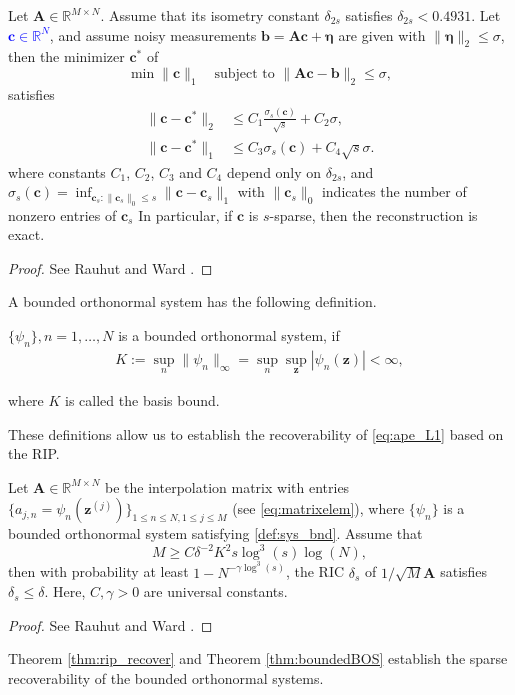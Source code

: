 \begin{thm}\label{thm:rip_recover}
Let $\bm A\in \mathbb{R}^{M\times N}$. Assume that its isometry constant $\delta_{2s}$ satisfies $\delta_{2s}<0.4931$. 
Let \textcolor{blue}{$\bm{c}\in\mathbb{R}^N$}, and assume noisy measurements $\bm{b} = \bm{A}\bm{c} + \bm{\eta}$ are given with $\|\bm{\eta}\|_2\leq \sigma$, then the minimizer $\bm{c}^*$ of 
\begin{equation*}
\min \|\bm{c}\|_1 \quad \textrm{subject to }\|\bm A\bm{c}-\bm{b}\|_2\leq \sigma,
\end{equation*}
satisfies
\begin{equation}\label{eq:error}
\begin{split}
\|\bm{c}-\bm{c}^*\|_2&\leq C_1 \frac{\sigma_s(\bm{c})}{\sqrt{s}}+C_2\sigma,\\
\|\bm{c}-\bm{c}^*\|_1&\leq C_3\sigma_s(\bm{c})+C_4\sqrt{s}\sigma.
\end{split}
\end{equation}
where constants $C_1$, $C_2$, $C_3$ and $C_4$ depend only on $\delta_{2s}$, and $\sigma_s(\bm{c}) = \inf_{{\bm{c}_s:\|\bm{c}_s\|_0\leq s}}\|\bm{c}-\bm{c}_s\|_1$ with $\|\bm{c}_s\|_0$ indicates the number of nonzero entries of $\bm{c}_s$ In particular, if $\bm{c}$ is $s$-sparse, then the reconstruction is exact.
\end{thm}
\begin{proof}
    See Rauhut and Ward \cite{Rauhut_2012sparseLegen}.
\end{proof}

A bounded orthonormal system has the following definition.
{\color{blue}\begin{defn}\label{def:bnd_orth_sys}
    $\{\psi_n\}, n = 1, \ldots, N$ is a bounded orthonormal system, if
    \begin{align}\label{def:sys_bnd}
        K:=\sup_{n}\|\psi_n\|_{\infty}=\sup_n\sup_{\bm{z}}|\psi_n(\bm{z})|< \infty,
    \end{align}
\end{defn}
where $K$ is called the basis bound. }

These definitions allow us to establish the recoverability of \eqref{eq:ape_L1} based on the \ac{RIP}.
\begin{thm}\label{thm:boundedBOS}
    Let $\bm A\in\mathbb{R}^{M\times N}$ be the interpolation matrix with entries 
    $\{a_{j,n}=\psi_n(\bm{z}^{(j)})\}_{1\leq n\leq N,1\leq j\leq M}$ (see \eqref{eq:matrixelem}), where $\{\psi_n\}$ 
    is a bounded orthonormal system satisfying \eqref{def:sys_bnd}. Assume that
    \begin{equation*}
        M\geq C\delta^{-2}K^2s\log^3(s)\log(N),
    \end{equation*}
    then with probability at least $1-N^{-\gamma\log^3(s)}$, the RIC $\delta_s$ of $1/\sqrt{M}\bm A$ satisfies $\delta_s\leq\delta$.
    Here, $C,\gamma>0$ are universal constants.
\end{thm}
\begin{proof}
    See Rauhut and Ward \cite{Rauhut_2012sparseLegen}.
\end{proof}

Theorem \ref{thm:rip_recover} and Theorem \ref{thm:boundedBOS} establish the sparse recoverability of the bounded orthonormal systems.
